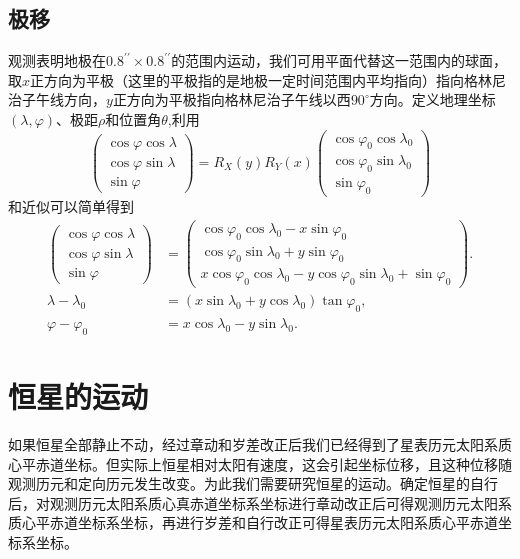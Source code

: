 \documentclass[11pt, a4paper, oneside]{ctexart}
\numberwithin{equation}{subsection}
\begin{document}
\subsection{极移}
观测表明地极在$0.8^{\prime\prime}\times0.8^{\prime\prime}$的范围内运动，我们可用平面代替这一范围内的球面，取$x$正方向为平极（这里的平极指的是地极一定时间范围内平均指向）指向格林尼治子午线方向，$y$正方向为平极指向格林尼治子午线以西$90^{\circ}$方向。定义地理坐标$\left(\lambda,\varphi\right)$、极距$\rho$和位置角$\theta$,利用
\begin{equation}
\begin{pmatrix}
\cos\varphi\cos\lambda\\
\cos\varphi\sin\lambda\\
\sin\varphi
\end{pmatrix}=R_X\left(y\right)R_Y\left(x\right)
\begin{pmatrix}
\cos\varphi_0\cos\lambda_0\\
\cos\varphi_0\sin\lambda_0\\
\sin\varphi_0
\end{pmatrix}
\end{equation}
和近似可以简单得到
\begin{align}
\begin{pmatrix}
\cos\varphi\cos\lambda\\
\cos\varphi\sin\lambda\\
\sin\varphi
\end{pmatrix}&=
\begin{pmatrix}
\cos\varphi_0\cos\lambda_0-x\sin\varphi_0\\
\cos\varphi_0\sin\lambda_0+y\sin\varphi_0\\
x\cos\varphi_0\cos\lambda_0-y\cos\varphi_0\sin\lambda_0+\sin\varphi_0
\end{pmatrix}.\\
\lambda-\lambda_{0}&=\left(x\sin\lambda_{0}+y\cos\lambda_{0}\right)\tan\varphi_{0},\\
\varphi-\varphi_{0}&=x\cos\lambda_{0}-y\sin\lambda_{0}.
\end{align}

\newpage
\section{恒星的运动}
如果恒星全部静止不动，经过章动和岁差改正后我们已经得到了星表历元太阳系质心平赤道坐标。但实际上恒星相对太阳有速度，这会引起坐标位移，且这种位移随观测历元和定向历元发生改变。为此我们需要研究恒星的运动。确定恒星的自行后，对观测历元太阳系质心真赤道坐标系坐标进行章动改正后可得观测历元太阳系质心平赤道坐标系坐标，再进行岁差和自行改正可得星表历元太阳系质心平赤道坐标系坐标。
\end{document}
